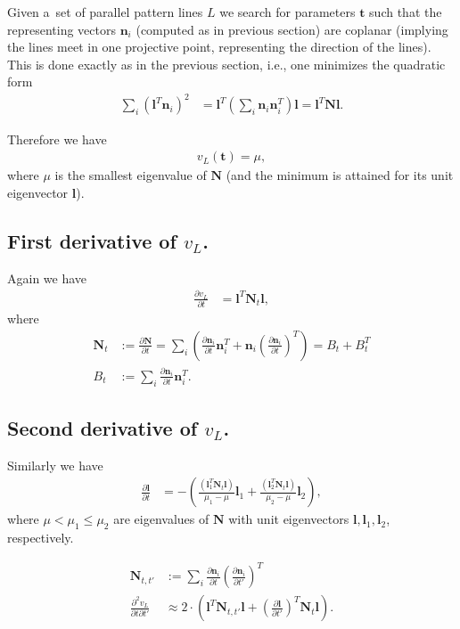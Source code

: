 \documentclass[12pt,a4paper]{amsart}
\renewcommand{\v}[1]{\mathbf{#1}}
\newcommand{\ddd}[2]{\frac{\partial #1}{\partial #2}}
\newcommand{\dddd}[3]{\frac{\partial^2 #1}{\partial #2 \partial #3}}
\begin{document}
Given a~set of parallel pattern lines $L$ we search for parameters $\v{t}$ such that the representing vectors $\v{n}_i$ (computed as in previous section)
are coplanar (implying the lines meet in one projective point, representing the direction of the lines).
This is done exactly as in the previous section, i.e., one minimizes the quadratic form
\begin{align*}
\sum_i (\v{l}^T \v{n}_i)^2 & = \v{l}^T \left( \sum_i \v{n}_i \v{n}_i^T \right) \v{l} = \v{l}^T \v{N} \v{l}.
\end{align*}

Therefore we have
\begin{align*}
v_L (\v{t}) = \mu,
\end{align*}
where $\mu$ is the smallest eigenvalue of $\v{N}$ (and the minimum is attained for its unit eigenvector $\v{l}$).

\subsection{First derivative of $v_L$.}

Again we have
\begin{align*}
\ddd{v_L}{t} & = \v{l}^T \v{N}_t \v{l},
\end{align*}
where
\begin{align*}
\v{N}_t & := \ddd{\v{N}}{t} = \sum_i \left( \ddd{\v{n}_i}{t} \v{n}_i^T + \v{n}_i \left(\ddd{\v{n}_i}{t}\right)^T \right) = B_t + B_t^T \\
B_t & := \sum_i \ddd{\v{n}_i}{t} \v{n}_i^T.
\end{align*}

\subsection{Second derivative of $v_L$.}

Similarly we have
\begin{align*}
\ddd{\v{l}}{t} & = - \left( \frac{(\v{l}_1^T\v{N}_t\v{l})}{\mu_1 - \mu} \v{l}_1 + \frac{(\v{l}_2^T\v{N}_t\v{l})}{\mu_2 - \mu} \v{l}_2 \right),
\end{align*}
where $\mu < \mu_1 \leq \mu_2$ are eigenvalues of $\v{N}$ with unit eigenvectors $\v{l}, \v{l}_1, \v{l}_2$, respectively.

\begin{align*}
\v{N}_{t, t'} & := \sum_i \ddd{\v{n}_i}{t} \left( \ddd{\v{n}_i}{t'} \right)^T \\
\dddd{v_L}{t}{t'} & \approx 2\cdot \left( \v{l}^T \v{N}_{t, t'} \v{l} + \left( \ddd{\v{l}}{t'} \right)^T \v{N}_t \v{l} \right).
\end{align*}
\end{document}
